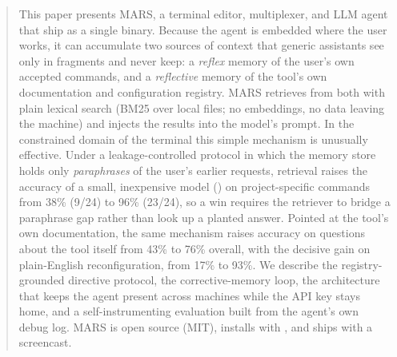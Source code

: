 \begin{abstract}
This paper presents MARS, a terminal editor, multiplexer, and LLM agent that ship as a
single binary. Because the agent is embedded where the user works, it can accumulate
two sources of context that generic assistants see only in fragments and never keep:
a \emph{reflex} memory of the user's own accepted commands, and a \emph{reflective}
memory of the tool's own documentation and configuration registry. MARS retrieves from both with plain lexical search (BM25 over
local files; no embeddings, no data leaving the machine) and injects the results into
the model's prompt. In the constrained domain of the terminal this simple
mechanism is unusually effective. Under a leakage-controlled protocol in which the
memory store holds only \emph{paraphrases} of the user's earlier requests, retrieval
raises the accuracy of a small, inexpensive model () on
project-specific commands from 38\% (9/24) to 96\% (23/24), so a win requires the
retriever to bridge a paraphrase gap rather than look up a planted answer. Pointed at
the tool's own documentation, the same mechanism raises accuracy on questions about
the tool itself from 43\% to 76\% overall, with the decisive gain on plain-English
reconfiguration, from 17\% to 93\%. We describe the registry-grounded directive protocol, the corrective-memory loop,
the architecture that keeps the agent present across machines while the API key stays
home, and a self-instrumenting evaluation built from the agent's own debug log. MARS is open
source (MIT), installs with , and ships with a
screencast.
\end{abstract}
